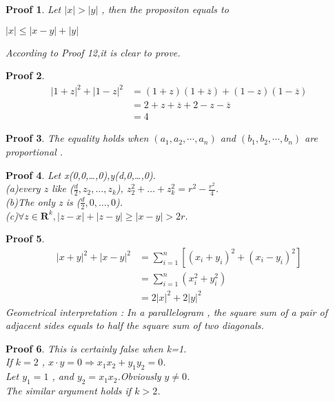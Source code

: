 \documentclass{report}
\newtheorem{myprf}{Proof}
\begin{document}
            \begin{myprf}
                Let $|x|>|y|$ , then
                the propositon equals to\\
                \centerline{$|x| \le |x-y|+|y|$}
                According to Proof 12,it is clear to prove.
            \end{myprf}
            \begin{myprf}
                \begin{align*}
                    |1+z|^{2}+|1-z|^2&=(1+z)(1+\overline{z})+(1-z)(1-\overline{z})\\
                                     &=2+z+\overline{z}+2-z-\overline{z}\\
                                     &=4
                \end{align*}
            \end{myprf}
            \begin{myprf}
                The equality holds when 
                $(a_1,a_2,\cdots,a_n)$ and $(b_1,b_2,\cdots,b_n)$ are proportional .
            \end{myprf}
            \begin{myprf}
                Let x(0,0,\dots,0),y(d,0,\dots,0).\\
                (a)every $z$ like ($\frac{d}{2},z_{2},\dots,z_{k}$),
                    $z_{2}^{2}+\dots+z_{k}^{2}=r^{2}-\frac{r^{2}}{4}$.\\
                (b)The only z is ($\frac{d}{2},0,\dots,0$).\\
                (c)$\forall z \in \mathbf{R}^k , |z-x|+|z-y| \ge |x-y| > 2r$.
            \end{myprf}
            \begin{myprf}
                \begin{align*}
                    |x+y|^2+|x-y|^2&=\sum_{i=1}^n[(x_i+y_i)^2+(x_i-y_i)^2]\\
                                   &=\sum_{i=1}^n(x_i^2+y_i^2)\\
                                   &=2|x|^2+2|y|^2
                \end{align*}
                Geometrical interpretation : 
                In a parallelogram , the square sum of a pair of adjacent sides 
                                    equals to half the square sum of two diagonals.
            \end{myprf}
            \begin{myprf}
                This is certainly false when k=1.\\
                If $k=2$ , $x\cdot y=0 \Rightarrow x_1x_2+y_1y_2=0$.\\
                Let $y_1=1$ , and $y_2=x_1x_2$.Obviously $y\not=0$.\\
                The similar argument holds if $k >2 $.
            \end{myprf}
              
\end{document}
